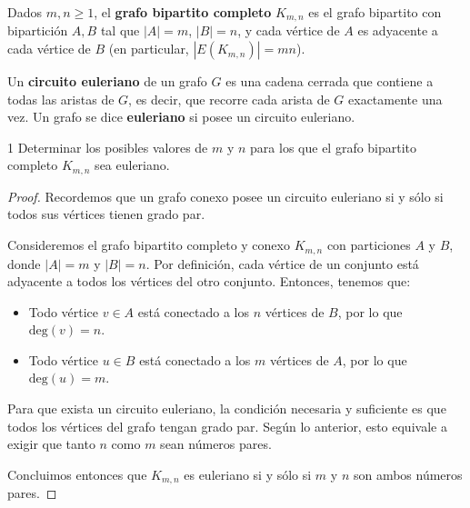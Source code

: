
\begin{definition}\label{def:kmn}
    Dados \( m, n \geq 1 \), el \textbf{grafo bipartito completo} \( K_{m,n} \) es el grafo bipartito con bipartición \( A, B \) tal que \( |A| = m \), \( |B| = n \), y cada vértice de \( A \) es adyacente a cada vértice de \( B \) (en particular, \( |E(K_{m,n})| = mn \)).
\end{definition}

\begin{definition}
    Un \textbf{circuito euleriano} de un grafo \( G \) es una cadena cerrada que contiene a todas las aristas de \( G \), es decir, que recorre cada arista de \( G \) exactamente una vez. Un grafo se dice \textbf{euleriano} si posee un circuito euleriano.
\end{definition}

\begin{ejercicioEntregar}{1}
    Determinar los posibles valores de \( m \) y \( n \) para los que el grafo bipartito completo \( K_{m,n} \) sea euleriano.
\end{ejercicioEntregar}
\begin{proof}
    Recordemos que un grafo conexo posee un circuito euleriano si y sólo si todos sus vértices tienen grado par.

    Consideremos el grafo bipartito completo y conexo \(K_{m,n}\) con particiones \(A\) y \(B\), donde \(|A| = m\) y \(|B| = n\). Por definición, cada vértice de un conjunto está adyacente a todos los vértices del otro conjunto. Entonces, tenemos que:
    \begin{itemize}
        \item Todo vértice \(v \in A\) está conectado a los \(n\) vértices de \(B\), por lo que \(\text{deg}(v) = n\).
        \item Todo vértice \(u \in B\) está conectado a los \(m\) vértices de \(A\), por lo que \(\text{deg}(u) = m\).
    \end{itemize}

    Para que exista un circuito euleriano, la condición necesaria y suficiente es que todos los vértices del grafo tengan grado par. Según lo anterior, esto equivale a exigir que tanto \(n\) como \(m\) sean números pares.

    Concluimos entonces que \(K_{m,n}\) es euleriano si y sólo si \(m\) y \(n\) son ambos números pares.
\end{proof}

\vspace{0.5cm}


